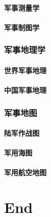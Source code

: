 \documentclass[UTF8]{../ApplicationUniverse}
\begin{document}
        \subsubsection{军事测量学}
        \subsubsection{军事制图学}
    \subsection{军事地理学}
        \subsubsection{世界军事地理}
        \subsubsection{中国军事地理}
    \subsection{军事地图}
        \subsubsection{陆军作战图}
        \subsubsection{军用海图}
        \subsubsection{军用航空地图}

\chapter{End}
\end{document}
